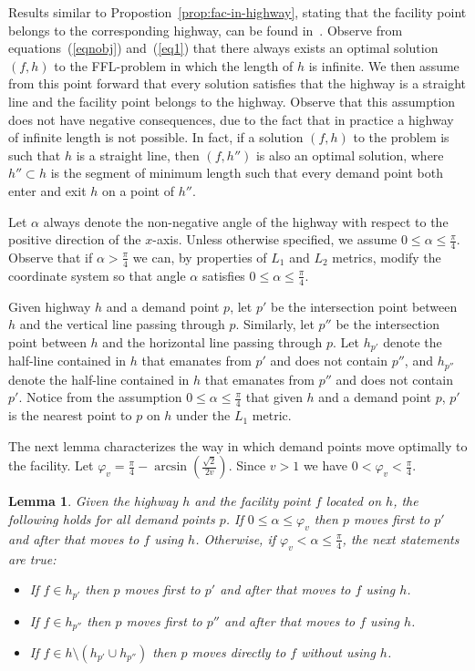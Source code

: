 \documentclass[11pt,a4paper,oneside,onecolumn]{article}
\newtheorem{lemma}[theorem]{Lemma}
\begin{document}
Results similar to Propostion~\ref{prop:fac-in-highway}, stating that
the facility point belongs to the corresponding highway, can be 
found in~\cite{diaz-banez11-3,espejo11}. 
Observe from equations~(\ref{eqnobj}) and~(\ref{eq1})
that there always exists an
optimal solution $(f,h)$ to the FFL-problem in which the length of
$h$ is infinite.
We then assume from this
point forward that every solution satisfies that the highway is a straight
line and the facility point belongs to the highway.
Observe that this assumption does not have negative consequences,
due to the fact that in practice a highway of infinite length is not
possible. In fact, if a solution $(f,h)$ to the problem is such that
$h$ is a straight line, then $(f,h'')$ is also an optimal solution,
where $h''\subset h$ is the segment of minimum length 
such that every demand point both enter and exit $h$ on a point of $h''$.

Let $\alpha$ always denote the non-negative angle of the highway
with respect to the positive direction of the $x$-axis. Unless
otherwise specified, we assume $0\leq\alpha\leq\frac{\pi}{4}$.
Observe that if $\alpha>\frac{\pi}{4}$ we can, by properties of
$L_1$ and $L_2$ metrics, modify the coordinate system so that angle
$\alpha$ satisfies $0\leq\alpha\leq\frac{\pi}{4}$.

Given highway $h$ and a demand point $p$, let $p'$ be the
intersection point between $h$ and the vertical line passing through
$p$. Similarly, let $p''$ be the intersection point between $h$ and
the horizontal line passing through $p$. Let $h_{p'}$ denote the
half-line contained in $h$ that emanates from $p'$ and does not
contain $p''$, and $h_{p''}$ denote the half-line contained in $h$
that emanates from $p''$ and does not contain $p'$. Notice from the
assumption $0\leq\alpha\leq\frac{\pi}{4}$ that given $h$ and a
demand point $p$, $p'$ is the nearest point to $p$ on $h$ under the
$L_1$ metric.

The next lemma characterizes the way in which demand points move
optimally to the facility.
Let $\varphi_v=\frac{\pi}{4}-\arcsin\left(\frac{\sqrt{2}}{2v}\right)$. Since $v>1$
we have $0<\varphi_v<\frac{\pi}{4}$.

\begin{lemma}\label{lemma:way-of-move}
Given the highway $h$ and the facility point $f$ located on $h$, the
following holds for all demand points $p$.
If $0\leq\alpha\leq\varphi_v$ then $p$ moves first to $p'$ and after
that moves to $f$ using $h$.
Otherwise, if $\varphi_v<\alpha\leq\frac{\pi}{4}$, the next
statements are true:
\begin{itemize}
  \item[$($a$)$] If $f\in h_{p'}$ then $p$ moves first to $p'$ and after that
moves to $f$ using $h$.
  \item[$($b$)$] If $f\in h_{p''}$ then $p$ moves first to $p''$ and after that
moves to $f$ using $h$.
  \item[$($c$)$] If $f\in h\setminus (h_{p'}\cup h_{p''})$ then $p$ moves
directly to $f$ without using $h$.
\end{itemize}
\end{lemma}
\end{document}
